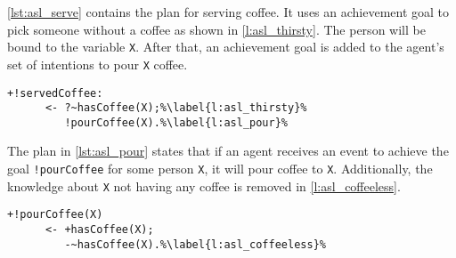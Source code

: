 \autoref{lst:asl_serve} contains the plan for serving coffee. It uses an achievement goal to pick someone without a coffee as shown in \autoref{l:asl_thirsty}. The person will be bound to the variable \texttt{X}. After that, an achievement goal is added to the agent's set of intentions to pour \texttt{X} coffee. %
\begin{lstlisting}[firstnumber=10, caption={Definition of the \texttt{servedCoffee} plan.}, label=lst:asl_serve]
  +!servedCoffee:
      <- ?~hasCoffee(X);%\label{l:asl_thirsty}%
         !pourCoffee(X).%\label{l:asl_pour}%
\end{lstlisting}
The plan in \autoref{lst:asl_pour} states that if an agent receives an event to achieve the goal \texttt{!pourCoffee} for some person \texttt{X}, it will pour coffee to \texttt{X}. Additionally, the knowledge about \texttt{X} not having any coffee is removed in \autoref{l:asl_coffeeless}.
\begin{lstlisting}[firstnumber=14, caption={Definition of the \texttt{pourCoffee} plan.}, label=lst:asl_pour]
  +!pourCoffee(X)
      <- +hasCoffee(X);
         -~hasCoffee(X).%\label{l:asl_coffeeless}%
\end{lstlisting}


